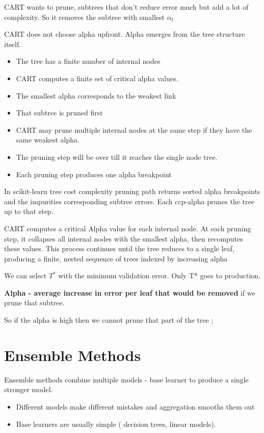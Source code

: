 \documentclass[10pt,a4paper]{article}
\begin{document}
		CART wants to prune, subtrees that don’t reduce error much but add a lot of complexity. So it removes the subtree with smallest $\alpha_t$
	
		CART does not choose alpha upfront. Alpha emerges from the tree structure itself.
	
		\begin{itemize}
			\item The tree has a finite number of internal nodes
			\item CART computes a finite set of critical alpha values.
			\item The smallest alpha corresponds to the weakest link
			\item That subtree is pruned first
			\item CART may prune multiple internal nodes at the same step if they have the same weakest alpha.
			\item The pruning step will be over till it reaches the single node tree.
			\item Each pruning step produces one alpha breakpoint
		\end{itemize}
	
		In scikit-learn tree cost complexity pruning path returns sorted alpha breakpoints and the impurities corresponding subtree errors. Each ccp-alpha prunes the tree up to that step.
	
		CART computes a critical Alpha value for each internal node. At each pruning step, it collapses all internal nodes with the smallest alpha, then recomputes these values. This process continues until the tree reduces to a single leaf, producing a finite, nested sequence of trees indexed by increasing alpha
	
		We can select $T^*$ with the minimum validation error. Only T* goes to production.
	
		\textbf{Alpha - average increase in error per leaf that would be removed} if we prune that subtree.
	
		So if the alpha is high then we cannot prune that part of the tree ;
	
		\section{Ensemble Methods}
	
		Ensemble methods combine multiple models - base learner to produce a single stronger model.
	
		\begin{itemize}
			\item Different models make different mistakes and aggregation smooths them out
			\item Base learners are usually simple ( decision trees, linear models).
		\end{itemize}
	
\end{document}

